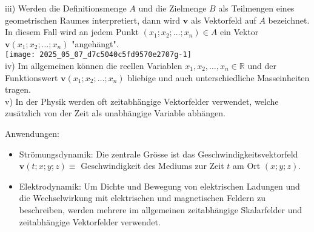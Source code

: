 \documentclass[10pt]{article}
\begin{document}
iii) Werden die Definitionsmenge $A$ und die Zielmenge $B$ als Teilmengen eines geometrischen Raumes interpretiert, dann wird $\mathbf{v}$ als Vektorfeld auf $A$ bezeichnet. In diesem Fall wird an jedem Punkt $\left(x_{1} ; x_{2} ; \ldots ; x_{n}\right) \in A$ ein Vektor $\mathbf{v}\left(x_{1} ; x_{2} ; \ldots ; x_{n}\right)$ "angehängt".\\
\texttt{[image: 2025\_05\_07\_d7c5040c5fd9570e2707g-1]}\\
iv) Im allgemeinen können die reellen Variablen $x_{1}, x_{2}, \ldots, x_{n} \in \mathbb{R}$ und der Funktionswert $\mathbf{v}\left(x_{1} ; x_{2} ; \ldots ; x_{n}\right)$ bliebige und auch unterschiedliche Masseinheiten tragen.\\
v) In der Physik werden oft zeitabhängige Vektorfelder verwendet, welche zusätzlich von der Zeit als unabhängige Variable abhängen.

Anwendungen:

\begin{itemize}
  \item Strömungsdynamik: Die zentrale Grösse ist das Geschwindigkeitsvektorfeld\\
$\mathbf{v}(t ; x ; y ; z) \equiv$ Geschwindigkeit des Mediums zur Zeit $t$ am Ort $(x ; y ; z)$.
  \item Elektrodynamik: Um Dichte und Bewegung von elektrischen Ladungen und die Wechselwirkung mit elektrischen und magnetischen Feldern zu beschreiben, werden mehrere im allgemeinen zeitabhängige Skalarfelder und zeitabhängige Vektorfelder verwendet.
\end{itemize}
\end{document}
